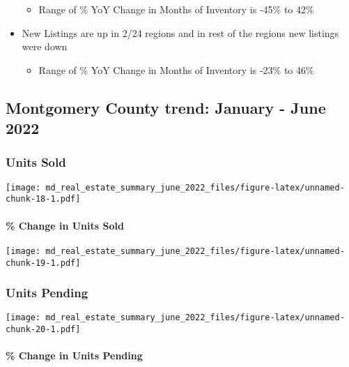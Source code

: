 \documentclass[
]{article}
\providecommand{\tightlist}{%
  \setlength{\itemsep}{0pt}\setlength{\parskip}{0pt}}
\begin{document}
\begin{itemize}
  \begin{itemize}
  \tightlist
  \item
    Range of \% YoY Change in Months of Inventory is -45\% to 42\%
  \end{itemize}
\item
  New Listings are up in 2/24 regions and in rest of the regions new
  listings were down

  \begin{itemize}
  \tightlist
  \item
    Range of \% YoY Change in Months of Inventory is -23\% to 46\%
  \end{itemize}
\end{itemize}

\hypertarget{montgomery-county-trend-january---june-2022}{%
\subsection{Montgomery County trend: January - June
2022}\label{montgomery-county-trend-january---june-2022}}

\hypertarget{units-sold-1}{%
\subsubsection{Units Sold}\label{units-sold-1}}

\texttt{[image: md\_real\_estate\_summary\_june\_2022\_files/figure-latex/unnamed-chunk-18-1.pdf]}

\hypertarget{change-in-units-sold-1}{%
\paragraph{\% Change in Units Sold}\label{change-in-units-sold-1}}

\texttt{[image: md\_real\_estate\_summary\_june\_2022\_files/figure-latex/unnamed-chunk-19-1.pdf]}

\hypertarget{units-pending-1}{%
\subsubsection{Units Pending}\label{units-pending-1}}

\texttt{[image: md\_real\_estate\_summary\_june\_2022\_files/figure-latex/unnamed-chunk-20-1.pdf]}

\hypertarget{change-in-units-pending-1}{%
\paragraph{\% Change in Units Pending}\label{change-in-units-pending-1}}
\end{document}
